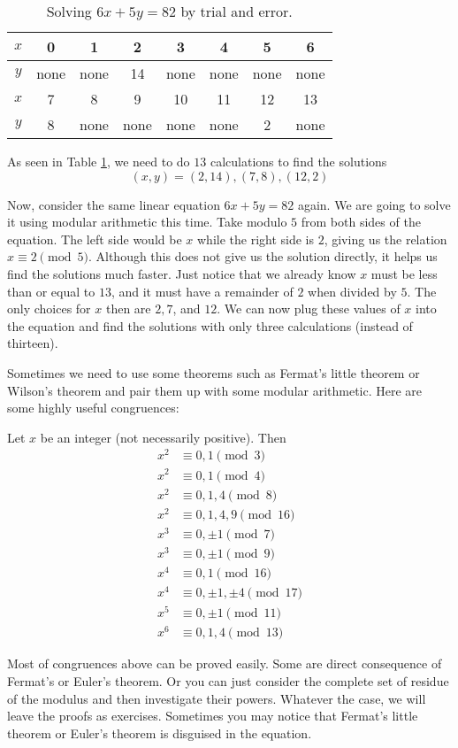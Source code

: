 \begin{table}[h]
\centering
\begin{tabular}{|c|c|c|c|c|c|c|c|}
\hline
$x$ & 0 & 1 & 2 & 3 & 4 & 5 & 6 \\
\hline
$y$ & none & none & 14 & none & none & none & none \\
\hline
$x$ & 7 & 8 & 9 & 10 & 11 & 12 & 13 \\
\hline
$y$ & 8 & none & none & none & none & 2 & none \\
\hline
\end{tabular}
\caption{Solving $6x+5y=82$ by trial and error.}
\label{table:diophantine}
\end{table}

	As seen in Table \ref{table:diophantine}, we need to do $13$ calculations to find the solutions $$(x, y)=(2,14), (7,8), (12, 2)$$

	Now, consider the same linear equation $6x+5y = 82$ again. We are going to solve it using modular arithmetic this time. Take modulo $5$ from both sides of the equation. The left side would be $x$ while the right side is $2$, giving us the relation $x \equiv 2 \pmod 5$. Although this does not give us the solution directly, it helps us find the solutions much faster. Just notice that we already know $x$ must be less than or equal to $13$, and it must have a remainder of $2$ when divided by $5$. The only choices for $x$ then are $2, 7$, and $12$. We can now plug these values of $x$ into the equation and find the solutions with only three calculations (instead of thirteen).


	Sometimes we need to use some theorems such as Fermat's little theorem or Wilson's theorem and pair them up with some modular arithmetic. Here are some highly useful congruences:
		\begin{theorem}\label{thm:diophModulo}
			Let $x$ be an integer (not necessarily positive). Then
			\begin{align*}
			x^2 & \equiv 0,1 \pmod3\\
			x^2 & \equiv 0,1 \pmod4\\
			x^2 & \equiv 0,1,4\pmod8\\
			x^2 & \equiv 0,1,4,9 \pmod{16}\\
			x^3 & \equiv 0, \pm1 \pmod7\\
			x^3 & \equiv 0, \pm1 \pmod9\\
			x^4 & \equiv 0,1 \pmod{16}\\
			x^4 & \equiv 0, \pm 1, \pm 4 \pmod{17}\\
			x^5 & \equiv 0, \pm1 \pmod{11}\\
			x^6 & \equiv 0,1,4 \pmod{13}
			\end{align*}
		\end{theorem}
	Most of congruences above can be proved easily. Some are direct consequence of Fermat's or Euler's theorem. Or you can just consider the complete set of residue of the modulus and then investigate their powers. Whatever the case, we will leave the proofs as exercises. Sometimes you may notice that Fermat's little theorem or Euler's theorem is disguised in the equation.

